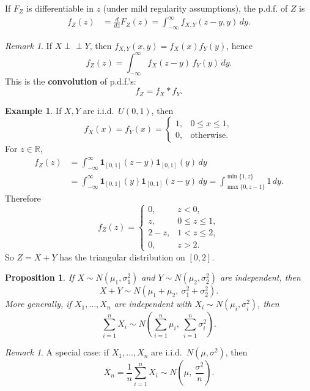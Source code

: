 \documentclass[11pt]{article}
\theoremstyle{plain}
\newtheorem{proposition}[theorem]{Proposition}
\theoremstyle{definition}
\newtheorem{example}[theorem]{Example}
\theoremstyle{remark}
\newtheorem{remark}[theorem]{Remark}
\begin{document}
	If \(F_Z\) is differentiable in \(z\) (under mild regularity assumptions), the p.d.f. of \(Z\) is
	\begin{align*}
		f_Z(z)
		&=\frac{d}{dz}F_Z(z)
		=\int_{-\infty}^{\infty} f_{X,Y}(z-y,y)\,dy.
	\end{align*}
	
	\begin{remark}
		If \(X\perp\!\!\!\perp Y\), then \(f_{X,Y}(x,y)=f_X(x)f_Y(y)\), hence
		\[
		f_Z(z)=\int_{-\infty}^{\infty} f_X(z-y)\,f_Y(y)\,dy.
		\]
		This is the \textbf{convolution} of p.d.f.'s:
		\[
		f_Z=f_X * f_Y.
		\]
	\end{remark}
	
	\begin{example}
		If \(X,Y\) are i.i.d.\ \(U(0,1)\), then
		\[
		f_X(x)=f_Y(x)=
		\begin{cases}
			1, & 0\le x\le 1,\\
			0, & \text{otherwise}.
		\end{cases}
		\]
		For \(z\in\mathbb{R}\),
		\begin{align*}
			f_Z(z)
			&=\int_{-\infty}^{\infty} \mathbf{1}_{[0,1]}(z-y)\mathbf{1}_{[0,1]}(y)\,dy\\
			&=\int_{-\infty}^{\infty} \mathbf{1}_{[0,1]}(y)\mathbf{1}_{[0,1]}(z-y)\,dy
			=\int_{\max\{0,z-1\}}^{\min\{1,z\}} 1\,dy.
		\end{align*}
		Therefore
		\[
		f_Z(z)=
		\begin{cases}
			0, & z<0,\\
			z, & 0\le z\le 1,\\
			2-z, & 1< z\le 2,\\
			0, & z>2.
		\end{cases}
		\]
		So \(Z=X+Y\) has the triangular distribution on \([0,2]\).
	\end{example}
	

	
	\begin{proposition}
		If \(X\sim N(\mu_1,\sigma_1^2)\) and \(Y\sim N(\mu_2,\sigma_2^2)\) are independent, then
		\[
		X+Y \sim N(\mu_1+\mu_2,\ \sigma_1^2+\sigma_2^2).
		\]
		More generally, if \(X_1,\dots,X_n\) are independent with \(X_i\sim N(\mu_i,\sigma_i^2)\), then
		\[
		\sum_{i=1}^n X_i \sim N\!\left(\sum_{i=1}^n \mu_i,\ \sum_{i=1}^n \sigma_i^2\right).
		\]
	\end{proposition}
	
	\begin{remark}
		A special case: if \(X_1,\dots,X_n\) are i.i.d.\ \(N(\mu,\sigma^2)\), then
		\[
		\overline{X}_n=\frac{1}{n}\sum_{i=1}^n X_i \sim N\!\left(\mu,\ \frac{\sigma^2}{n}\right).
		\]
	\end{remark}
	
\end{document}
